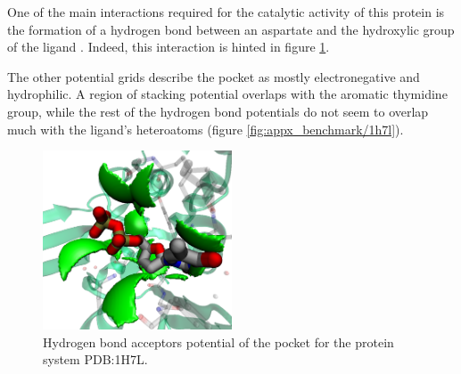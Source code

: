       One of the main interactions required for the catalytic activity of this protein is the formation of a hydrogen bond between an aspartate and the hydroxylic group of the ligand \cite{benchmark_1h7l_2001}. Indeed, this interaction is hinted in figure \ref{fig:benchmark/1h7l}.

      The other potential grids describe the pocket as mostly electronegative and hydrophilic. A region of stacking potential overlaps with the aromatic thymidine group, while the rest of the hydrogen bond potentials do not seem to overlap much with the ligand's heteroatoms (figure \ref{fig:appx_benchmark/1h7l}).

      \begin{figure}[H]
        \centering
        \includegraphics[width=0.5\textwidth]{figures/results/benchmark_prot/1h7l.png}
        \caption{\label{fig:benchmark/1h7l} Hydrogen bond acceptors potential of the pocket for the protein system PDB:1H7L.}
      \end{figure}
    \pagebreak

